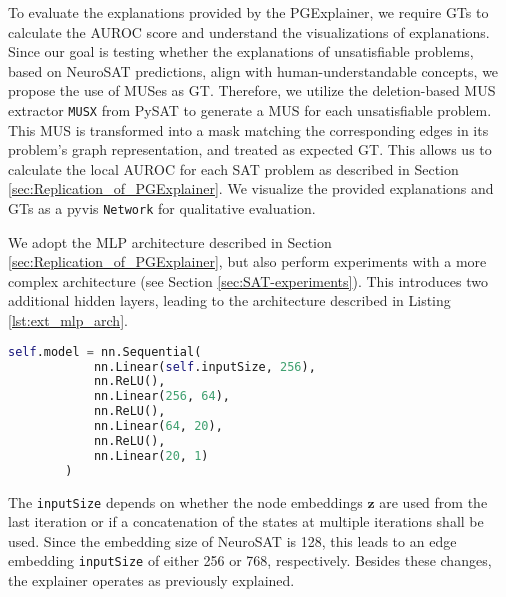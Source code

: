 To evaluate the explanations provided by the PGExplainer, we require \acp{GT} to calculate the AUROC score and understand the visualizations of explanations. Since our goal is testing whether the explanations of unsatisfiable problems, based on NeuroSAT predictions, align with human-understandable concepts, we propose the use of MUSes as \ac{GT}. Therefore, we utilize the deletion-based MUS extractor \lstinline|MUSX| from PySAT \cite{imms-sat18} to generate a MUS for each unsatisfiable problem. This \ac{MUS} is transformed into a mask matching the corresponding edges in its problem's graph representation, and treated as expected \ac{GT}. This allows us to calculate the local AUROC for each SAT problem as described in Section \ref{sec:Replication_of_PGExplainer}. We visualize the provided explanations and \acp{GT} as a pyvis \cite{perrone2020network} \lstinline|Network| for qualitative evaluation. \bigskip

We adopt the MLP architecture described in Section \ref{sec:Replication_of_PGExplainer}, but also perform experiments with a more complex architecture (see Section \ref{sec:SAT-experiments}). This introduces two additional hidden layers, leading to the architecture described in Listing \ref{lst:ext_mlp_arch}.
\begin{lstlisting}[language=Python, caption=Implementation of extended MLP architecture., label=lst:ext_mlp_arch]
    self.model = nn.Sequential(
            nn.Linear(self.inputSize, 256),
            nn.ReLU(),
            nn.Linear(256, 64),
            nn.ReLU(),
            nn.Linear(64, 20),
            nn.ReLU(),
            nn.Linear(20, 1)
        )
\end{lstlisting}
The \lstinline|inputSize| depends on whether the node embeddings $\mathbf{z}$ are used from the last iteration or if a concatenation of the states at multiple iterations shall be used. Since the embedding size of NeuroSAT is 128, this leads to an edge embedding \lstinline|inputSize| of either 256 or 768, respectively. Besides these changes, the explainer operates as previously explained.